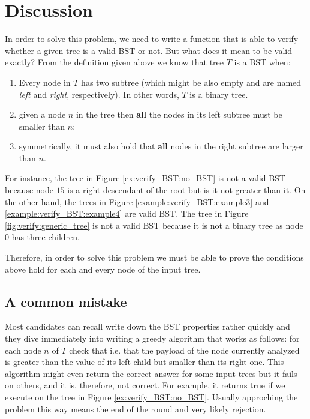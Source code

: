 \section{Discussion}
\label{verify_BST:sec:discussion}
In order to solve this problem, we need to write a function that is able to verify whether a given tree is a valid BST or not. But what does it mean to be valid exactly?
From the definition given above we know that tree $T$ is a BST when:
\begin{enumerate}
	\item Every node in $T$ has two subtree (which might be also empty and are named \textit{left} and \textit{right}, respectively). In other words, $T$ is a binary tree.
	\item given a node $n$ in the tree then \textbf{all} the nodes in its left subtree must be smaller than $n$;
	\item symmetrically, it must also hold that \textbf{all} nodes in the right subtree are larger than $n$.
\end{enumerate}
For instance, the tree in Figure \ref{ex:verify_BST:no_BST} is not a valid BST because node $15$ is a right descendant of the root but is it not greater than it. On the other hand, the trees in Figure \ref{example:verify_BST:example3} and \ref{example:verify_BST:example4} are valid BST. The tree in Figure \ref{fig:verify:generic_tree} is not a valid BST because it is not a binary tree as node $0$ has three children.

Therefore, in order to solve this problem we must be able to prove the conditions above hold for each and every node of the input tree. 

\subsection{A common mistake}
Most candidates can recall write down the BST properties rather quickly and they dive immediately into writing a greedy algorithm that works as follows: for each node $n$ of $T$ check that 
 i.e. that the payload of the node currently  analyzed is greater than the value of its left child but smaller than its right one.
This algorithm might even return the correct answer for some input trees but it fails on others, and it is, therefore, not correct.
For example, it returns true if we execute on the tree in Figure \ref{ex:verify_BST:no_BST}.
Usually approching the problem this way means the end of the round and very likely  rejection. 

